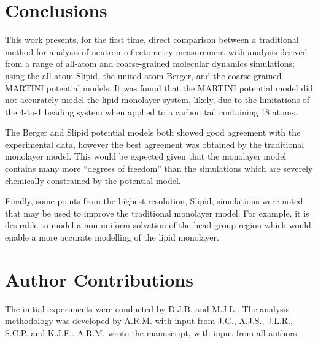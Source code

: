 \documentclass[amsmath,amssymb,twocolumn,superscriptaddress]{revtex4-1}
\begin{document}
\section{Conclusions}
This work presents, for the first time, direct comparison between a
traditional method for analysis of neutron reflectometry measurement with
analysis derived from a range of all-atom and coarse-grained molecular
dynamics simulations; using the all-atom Slipid, the united-atom Berger,
and the coarse-grained MARTINI potential models.
It was found that the MARTINI potential model did not accurately
model the lipid monolayer system, likely, due to the limitations of the 4-to-1
beading system when applied to a carbon tail containing 18 atoms.

The Berger and Slipid potential models both showed good agreement with the
experimental data, however the best agreement was obtained by the
traditional monolayer model.
This would be expected given that the monolayer model contains many more
``degrees of freedom'' than the simulations which are severely chemically
constrained by the potential model.

Finally, some points from the highest resolution, Slipid, simulations were
noted that may be used to improve the traditional monolayer model.
For example, it is desirable to model a non-uniform solvation of the head
group region which would enable a more accurate modelling of the lipid
monolayer.

\section{Author Contributions}
The initial experiments were conducted by D.J.B. and M.J.L..
The analysis methodology was developed by A.R.M. with input from J.G.,
A.J.S., J.L.R., S.C.P. and K.J.E..
A.R.M. wrote the manuscript, with input from all authors.



\end{document}
